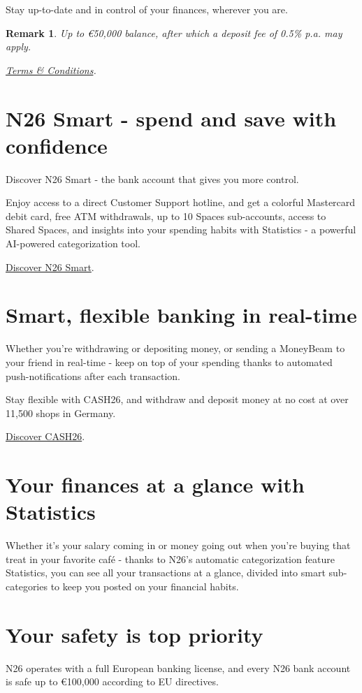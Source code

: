 \documentclass[onsided]{book}
\numberwithin{equation}{section}
\newtheorem{remark}{Remark}[section]
\begin{document}
Stay up-to-date and in control of your finances, wherever you are.

\begin{remark}
    Up to €50,000 balance, after which a deposit fee of 0.5\% p.a. may apply.
    
    \href{https://n26.com/en-de/legal-documents}{Terms \& Conditions}.
\end{remark}

\section{N26 Smart - spend and save with confidence}
Discover N26 Smart - the bank account that gives you more control.

Enjoy access to a direct Customer Support hotline, and get a colorful Mastercard debit card, free ATM withdrawals, up to 10 Spaces sub-accounts, access to Shared Spaces, and insights into your spending habits with Statistics - a powerful AI-powered categorization tool.

\href{https://n26.com/en-de/bank-account}{Discover N26 Smart}.

\section{Smart, flexible banking in real-time}
Whether you're withdrawing or depositing money, or sending a MoneyBeam to your friend in real-time - keep on top of your spending thanks to automated push-notifications after each transaction.

Stay flexible with CASH26, and withdraw and deposit money at no cost at over 11,500 shops in Germany.

\href{https://n26.com/en-de/cash26}{Discover CASH26}.

\section{Your finances at a glance with Statistics}
Whether it's your salary coming in or money going out when you're buying that treat in your favorite café - thanks to N26's automatic categorization feature Statistics, you can see all your transactions at a glance, divided into smart sub-categories to keep you posted on your financial habits.

\section{Your safety is top priority}
N26 operates with a full European banking license, and every N26 bank account is safe up to €100,000 according to EU directives.
\end{document}
